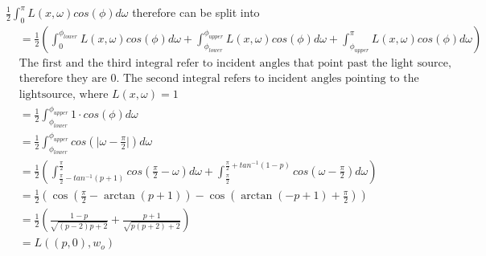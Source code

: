 \documentclass[a4paper]{scrartcl}
\begin{document}
    $ \frac{1}{2}\int_{0}^\pi L(x,\omega)cos(\phi)d\omega$ therefore can be split into 
    \begin{align*}
      &=\frac{1}{2}(\int_{0}^{\phi_{lower}} L(x,\omega)cos(\phi)d\omega + \int_{\phi_{lower}}^{\phi_{upper}} L(x,\omega)cos(\phi)d\omega + \int_{\phi_{upper}}^{\pi} L(x,\omega)cos(\phi)d\omega)\\
      &\text{The first and the third integral refer to incident angles that point past the light source, } \\
      &\text{therefore they are 0. The second integral refers to incident angles pointing to the } \\
      &\text{lightsource, where } L(x,\omega) = 1\\
      &=\frac{1}{2} \int_{\phi_{lower}}^{\phi_{upper}} 1\cdot cos(\phi)d\omega\\
      &=\frac{1}{2} \int_{\phi_{lower}}^{\phi_{upper}} cos(\lvert \omega - \frac{\pi}{2} \rvert)d\omega \\
      &=\frac{1}{2} \left( \int_{\frac{\pi}{2} - tan^{-1}(p+1)}^{\frac{\pi}{2}} cos(\frac{\pi}{2} - \omega )d\omega +  \int_{\frac{\pi}{2}}^{\frac{\pi}{2} + tan^{-1}(1-p)}cos(\omega - \frac{\pi}{2} )d\omega\right)\\
      &= \frac{1}{2}\left(\cos \left(\frac{\pi }{2}-\arctan \left(p+1\right)\right)-\cos \left(\arctan \left(-p+1\right)+\frac{\pi }{2}\right)\right) \\
      &= \frac{1}{2}\left( \frac{1-p}{\sqrt{(p-2)p + 2}} + \frac{p+1}{\sqrt{p(p+2) + 2}} \right) \\
      &= L((p,0), w_o)
    \end{align*}


  
\end{document}
